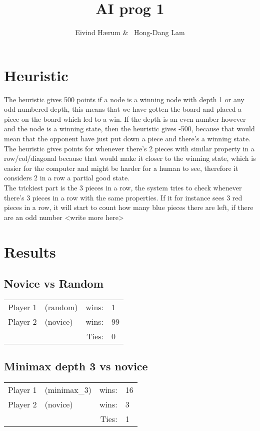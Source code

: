 \documentclass[12pt, a4paper]{article}
\title{AI prog 1}
\author{Eivind Hærum \& \ Hong-Dang Lam}
\begin{document}
\maketitle
% 
% 
 
\newpage
\tableofcontents
\newpage
 

\section{Heuristic}
The heuristic gives 500 points if a node is a winning node with depth 1 or any odd numbered depth, this means that we have gotten the board and placed a piece on the board which led to a win. If the depth is an even number however and the node is a winning state, then the heuristic gives -500, because that would mean that the opponent have just put down a piece and there's a winning state. \\
The heuristic gives points for whenever there's 2 pieces with similar property in a row/col/diagonal because that would make it closer to the winning state, which is easier for the computer and might be harder for a human to see, therefore it considers 2 in a row a partial good state. \\
The trickiest part is the 3 pieces in a row, the system tries to check whenever there's 3 pieces in a row with the same properties. If it for instance sees 3 red pieces in a row, it will start to count how many blue pieces there are left, if there are an odd number <write  more here>
\section{Results}

\subsection{Novice vs Random}
  \begin{tabular}{| l  l  r l |}
    \hline
 	Player 1 & (random) & wins: & 1 \\
 	Player 2 & (novice) & wins: & 99 \\
 	& &  Ties: & 0 \\
    \hline
  \end{tabular}



\subsection{Minimax depth 3 vs novice}
  \begin{tabular}{| l  l  r l |}
    \hline
 	Player 1 & (minimax\_3) & wins: & 16 \\
 	Player 2 & (novice) & wins: & 3 \\
 	& &  Ties: & 1 \\
    \hline
  \end{tabular}
\end{document}

